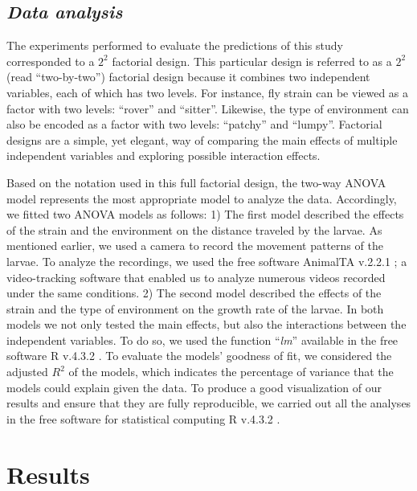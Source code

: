 \documentclass[12pt]{article}
\begin{document}
\vspace{20px}

\subsection*{\normalsize \textit{Data analysis}}

The experiments performed to evaluate the predictions of this study corresponded to a $2^2$ factorial design. This particular design is referred to as a $2^2$ (read ``two-by-two'') factorial design because it combines two independent variables, each of which has two levels. For instance, fly strain can be viewed as a factor with two levels: ``rover'' and ``sitter''. Likewise,  the type of environment can also be encoded as a factor with two levels: ``patchy'' and ``lumpy''. Factorial designs are a simple, yet elegant, way of comparing the main effects of multiple independent variables and exploring possible interaction effects.

\vspace{20px}

Based on the notation used in this full factorial design, the two-way ANOVA model represents the most appropriate model to analyze the data. Accordingly, we fitted two ANOVA models as follows: 1) The first model described the effects of the strain and the environment on the distance traveled by the larvae. As mentioned earlier, we used a camera to record the movement patterns of the larvae. To analyze the recordings, we used the free software AnimalTA v.2.2.1 \citep{chiara2023animalta}; a video-tracking software that enabled us to analyze numerous videos recorded under the same conditions. 2) The second model described the effects of the strain and the type of environment on the growth rate of the larvae. In both models we not only tested the main effects, but also the interactions between the independent variables. To do so, we used the function ``\textit{lm}'' available in the free software R v.4.3.2 \citep[2023-10-31,][]{rcore}. To evaluate the models’ goodness of fit, we considered the adjusted $R^2$ of the models, which indicates the percentage of variance that the models could explain given the data. To produce a good visualization of our results and ensure that they are fully reproducible, we carried out all the analyses in the free software for statistical computing R v.4.3.2 \citep[2023-10-31,][]{rcore}.

\vspace{20px}


\section*{\normalsize Results}
\end{document}
